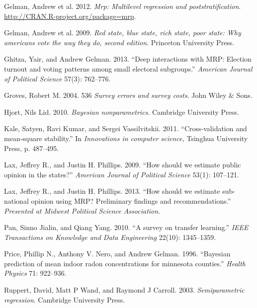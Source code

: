 \documentclass[11pt,article,oneside]{memoir}
\begin{document}
Gelman, Andrew et al. 2012. \emph{Mrp: Multilevel regression and
poststratification}. \url{http://CRAN.R-project.org/package=mrp}.

Gelman, Andrew et al. 2009. \emph{Red state, blue state, rich state,
poor state: Why americans vote the way they do, second edition}.
Princeton University Press.

Ghitza, Yair, and Andrew Gelman. 2013. ``Deep interactions with MRP:
Election turnout and voting patterns among small electoral subgroups.''
\emph{American Journal of Political Science} 57(3): 762--776.

Groves, Robert M. 2004. 536 \emph{Survey errors and survey costs}. John
Wiley \& Sons.

Hjort, Nils Lid. 2010. \emph{Bayesian nonparametrics}. Cambridge
University Press.

Kale, Satyen, Ravi Kumar, and Sergei Vassilvitskii. 2011.
``Cross-validation and mean-square stability.'' In \emph{Innovations in
computer science,} Tsinghua University Press, p. 487--495.

Lax, Jeffrey R., and Justin H. Phillips. 2009. ``How should we estimate
public opinion in the states?'' \emph{American Journal of Political
Science} 53(1): 107--121.

Lax, Jeffrey R., and Justin H. Phillips. 2013. ``How should we estimate
sub-national opinion using MRP? Preliminary findings and
recommendations.'' \emph{Presented at Midwest Political Science
Association}.

Pan, Sinno Jialin, and Qiang Yang. 2010. ``A survey on transfer
learning.'' \emph{IEEE Transactions on Knowledge and Data Engineering}
22(10): 1345--1359.

Price, Phillip N., Anthony V. Nero, and Andrew Gelman. 1996. ``Bayesian
prediction of mean indoor radon concentrations for minnesota counties.''
\emph{Health Physics} 71: 922--936.

Ruppert, David, Matt P Wand, and Raymond J Carroll. 2003.
\emph{Semiparametric regression}. Cambridge University Press.
\end{document}
